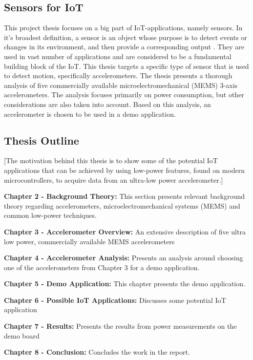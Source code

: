 \subsection{Sensors for IoT}

This project thesis focuses on a big part of IoT-applications, namely sensors. In it's broadest definition, a sensor is an object whose purpose is to detect events or changes in its environment, and then provide a corresponding output \cite{wikipedia_sensors}. They are used in vast number of applications and are considered to be a fundamental building block of the IoT. This thesis targets a specific type of sensor that is used to detect motion, specifically accelerometers. The thesis presents a thorough analysis of five commercially available microelectromechanical (MEMS) 3-axis accelerometers. The analysis focuses primarily on power consumption, but other considerations are also taken into account. Based on this analysis, an accelerometer is chosen to be used in a demo application.

\subsection{Thesis Outline}

[The motivation behind this thesis is to show some of the potential IoT applications that can be achieved by using low-power features, found on modern microcontrollers, to acquire data from an ultra-low power accelerometer.]

\textbf{Chapter 2 - Background Theory:} This section presents relevant background theory regarding accelerometers, microelectromechanical systems (MEMS) and common low-power techniques.  

\textbf{Chapter 3 - Accelerometer Overview:} An extensive description of five ultra low power, commercially available MEMS accelerometers

\textbf{Chapter 4 - Accelerometer Analysis:} Presents an analysis around choosing one of the accelerometers from Chapter 3 for a demo application.

\textbf{Chapter 5 - Demo Application:} This chapter presents the demo application.

\textbf{Chapter 6 - Possible IoT Applications:} Discusses some potential IoT application

\textbf{Chapter 7 - Results:} Presents the results from power measurements on the demo board

\textbf{Chapter 8 - Conclusion:} Concludes the work in the report.

